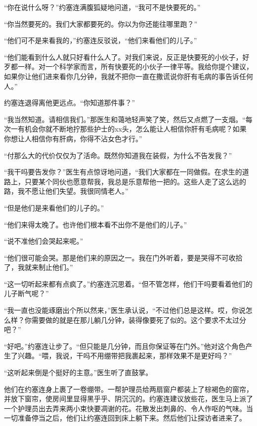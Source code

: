     “你在说什么呀？”约塞连满腹狐疑地问道，“我可不是快要死的。”

    “你当然要死的。我们大家都要死的。你以为你还能往哪里跑？”

    “他们可不是来看我的，”约塞连反驳说，“他们来看他们的儿子。”

    “他们能看到什么人就只好看什么人了。对我们来说，反正是快要死的小伙子，好歹都一样。对一个科学家而言，所有快要死的小伙子一律平等。我给你提个建议，如果你让他们进来看你几分钟，我就不把你一直在撒谎说你肝有毛病的事告诉任何人。”

    约塞连退得离他更远点。“你知道那件事？”

    “我当然知道。请相信我们。”那医生和蔼地轻声笑了笑，然后又点燃了一支烟。“每次一有机会你就不断地拧那些护士的xx头，怎么能让人相信你肝有毛病呢？如果你想让人相信你有肝病，你得不沾女色才行。”

    “付那么大的代价仅仅为了活命。既然你知道我在装假，为什么不告发我？”

    “我干吗要告发你？”医生有点惊讶地问道，“我们大家都在一同做假。在求生的道路上，只要某个同伙也愿意帮我，我总是乐意帮他一把的。这些人走了这么远的路，我不愿让他们失望。我很同情老人。”

    “但是他们是来看他们的儿子的。”

    “他们来得太晚了。也许他们根本看不出你不是他们的儿子。”

    “说不准他们会哭起来呢。”

    “他们很可能会哭。那是他们来的原因之一。我在门外听着，要是哭得不可收拾了，我就来制止他们。”

    “这一切听起来都有点疯了。”约塞连沉思着。“但不管怎样，他们干吗要看着他们的儿子断气呢？”

    “我一直也没能琢磨出个所以然来，”医生承认说，“不过他们总是这样。哎，你说怎么样？你需要做的就是在那儿躺几分钟，装得像要死了似的。这个要求不太过分吧？”

    “好吧。”约塞连让步了。“但只能是几分钟，而且你保证等在门外。”他对这个角色产生了兴趣。“喂，我说，干吗不用绷带把我裹起来，那样效果不是更好吗？”

    “这听起来倒是个挺好的主意。”医生听了直鼓掌。

    他们在约塞连身上裹了一卷绷带。一帮护理员给两扇窗户都装上了棕褐色的窗帘，并放下窗帘，使房间里显得黑乎乎、阴沉沉的。约塞连建议放些花，医生马上派了一个护理员出去弄来两小束快要凋谢的花。花散发出刺鼻的、令人作呕的气味。当一切准备停当之后，他们让约塞连回到床上躺下来。然后他们让探访者进来了。

